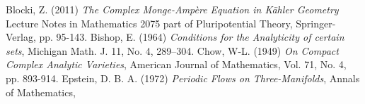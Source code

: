 \documentclass[letterpaper]{beamer}
\begin{document}
\begin{thebibliography}{3}
 Blocki, Z. (2011) \textit{The Complex Monge-Amp\`ere Equation in K\"ahler Geometry} Lecture Notes in Mathematics 2075
part of Pluripotential Theory, Springer-Verlag, pp. 95-143.
 Bishop, E. (1964) \textit{Conditions for the Analyticity  of certain sets}, Michigan Math. J. 11, No. 4, 289--304.
 Chow, W-L. (1949) \textit{On Compact Complex Analytic Varieties},
American Journal of Mathematics, Vol. 71, No. 4, pp. 893-914.
 Epstein, D. B. A. (1972) \textit{Periodic Flows on Three-Manifolds}, Annals of Mathematics,

\end{thebibliography}
\end{document}
